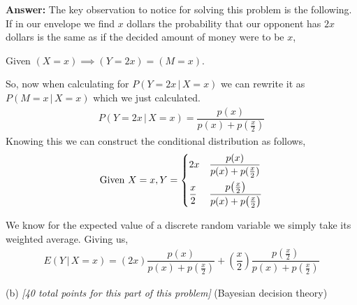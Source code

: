 \documentclass[12pt]{article}
\newcommand{\given}{\, | \,}
\begin{document}
{\bf Answer:} The key observation to notice for solving this problem is the following. If in our envelope we find $x$ dollars the probability that our opponent has $2x$ dollars is the same as if the decided amount of money were to be $x$,
\begin{center}
    Given $(X=x)\implies (Y=2x) = (M=x)$. 
\end{center}
So, now when calculating for $P(Y = 2x \given X = x)$ we can rewrite it as $P(M = x \given X = x)$ which we just calculated.
\begin{align*}
    P(Y = 2x \given X =x) = \dfrac{p(x)}{p(x) + p(\frac{x}{2})}
\end{align*}
Knowing this we can construct the conditional distribution as follows,
\begin{align*}
    \text{Given } X = x, Y = \begin{dcases}
        2x & \dfrac{p(x)}{p(x) + p(\frac{x}{2})} \\ \dfrac{x}{2} & \dfrac{ p \! \left( \frac{ x }{ 2 } \right) }{ p( x ) + p \! \left( \frac{ x }{ 2 } \right) }
    \end{dcases}
\end{align*}

We know for the expected value of a discrete random variable we simply take its weighted average. Giving us,
\begin{align*}
    E(Y\given X = x) = (2x)\dfrac{p(x)}{p(x) + p(\frac{x}{2})} + (\dfrac{x}{2})\dfrac{ p \! \left( \frac{ x }{ 2 } \right) }{ p( x ) + p \! \left( \frac{ x }{ 2 } \right) }
\end{align*}


(b) \textit{[40 total points for this part of this problem]} (Bayesian decision theory)
\end{document}
